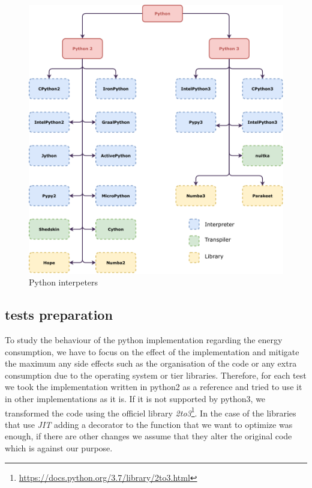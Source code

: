 \begin{figure}[thb]
    \centering
    \includegraphics[width=\linewidth]{imgs/python-implementations-tree}
    \caption{Python interpeters}
    \label{fig:interpreters}
\end{figure}



\subsection{tests preparation}



To study the behaviour of the python implementation regarding the energy consumption, we have to focus on the effect of the implementation and mitigate the maximum any side effects such as the organisation of the code or any extra consumption due to the operating system or tier libraries.
Therefore, for each test we took the implementation written in python2 as a reference and tried to use it in other implementations as it is. If it is not supported by python3, we transformed the code using the officiel library  \emph{2to3}\footnote{\url{https://docs.python.org/3.7/library/2to3.html}}.
In the case of the libraries that use \emph{JIT} adding a decorator to the function that we want to optimize was enough, if there are other changes we assume that they alter the original code which is against our purpose.

